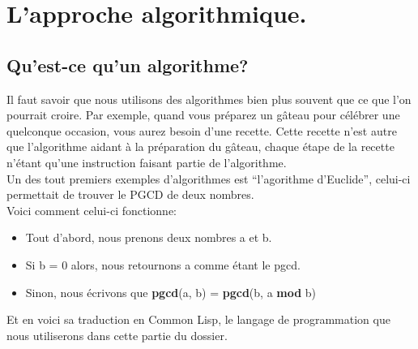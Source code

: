 \documentclass[a4paper, 12pt]{article}
\numberwithin{equation}{subsection}
\begin{document}
\section{L'approche algorithmique.}
\subsection{Qu'est-ce qu'un algorithme?}
\begin{center}
\end{center}

Il faut savoir que nous utilisons des algorithmes bien plus souvent que ce que l'on pourrait croire. Par exemple, quand vous préparez un gâteau pour célébrer une quelconque occasion, vous aurez besoin d'une recette. Cette recette n'est autre que l'algorithme aidant à la préparation du gâteau, chaque étape de la recette n'étant qu'une instruction faisant partie de l'algorithme. \\[0.2cm]
Un des tout premiers exemples d'algorithmes est ``l'agorithme d'Euclide'', celui-ci permettait de trouver le PGCD de deux nombres.\\
Voici comment celui-ci fonctionne: \\[0.2cm]
\begin{itemize}
  \item Tout d'abord, nous prenons deux nombres a et b.
  \item Si b = 0 alors, nous retournons a comme étant le pgcd.
  \item Sinon, nous écrivons que {\bf pgcd}(a, b) = {\bf pgcd}(b, a {\bf mod} b)\\[0.2cm]
\end{itemize}
Et en voici sa traduction en Common Lisp, le langage de programmation que nous utiliserons dans cette partie du dossier.

\end{document}
